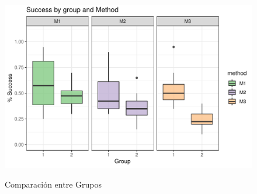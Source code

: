 \documentclass[a4paper,12pt]{article}
\begin{document}
\begin{figure}[H]
	\centering
		\caption{Comparación entre Grupos}
	\includegraphics[scale=0.7]{plot1.pdf}
	\label{p1}
\end{figure}
\end{document}
